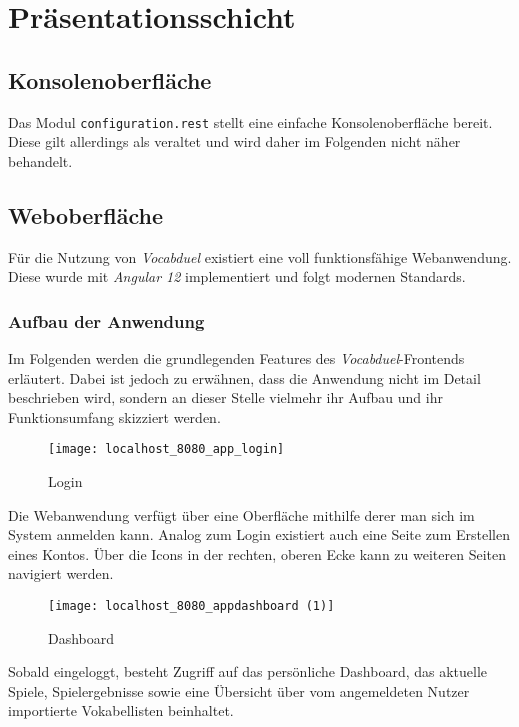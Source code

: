 \section{Präsentationsschicht}\label{sec:praesentationsschicht}

\subsection{Konsolenoberfläche}

Das Modul \texttt{configuration.rest} stellt eine einfache Konsolenoberfläche bereit.
Diese gilt allerdings als veraltet und wird daher im Folgenden nicht näher behandelt.

\subsection{Weboberfläche}

Für die Nutzung von \textit{Vocabduel} existiert eine voll funktionsfähige Webanwendung.
Diese wurde mit \textit{Angular 12} implementiert und folgt modernen Standards.

\subsubsection{Aufbau der Anwendung}

Im Folgenden werden die grundlegenden Features des \textit{Vocabduel}-Frontends erläutert.
Dabei ist jedoch zu erwähnen, dass die Anwendung nicht im Detail beschrieben wird, sondern
an dieser Stelle vielmehr ihr Aufbau und ihr Funktionsumfang skizziert werden.

\begin{figure}[H]
    \centering
    \texttt{[image: localhost\_8080\_app\_login]}
    \caption[]{Login}
    \label{fig:felogin}
\end{figure}

Die Webanwendung verfügt über eine Oberfläche mithilfe derer man sich im System anmelden kann.
Analog zum Login existiert auch eine Seite zum Erstellen eines Kontos.
Über die Icons in der rechten, oberen Ecke kann zu weiteren Seiten navigiert werden.

\begin{figure}[H]
    \centering
    \texttt{[image: localhost\_8080\_appdashboard (1)]}
    \caption[]{Dashboard}
    \label{fig:fedashboard}
\end{figure}

Sobald eingeloggt, besteht Zugriff auf das persönliche Dashboard, das aktuelle Spiele, Spielergebnisse sowie eine Übersicht
über vom angemeldeten Nutzer importierte Vokabellisten beinhaltet.

